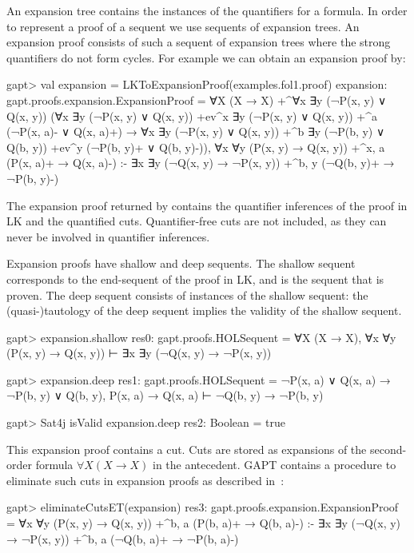 \documentclass[a4paper,11pt]{book}
\newcommand{\impl}{\to} %
\newcommand{\cli}[1]{{\ttfamily {#1}}}
\begin{document}
An expansion tree contains the instances of the quantifiers for a formula.  In order
to represent a proof of a sequent we use sequents of expansion trees.  An
expansion proof consists of such a sequent of expansion trees where the
strong quantifiers do not form cycles.
For example we can obtain an expansion proof by:
\begin{clilisting}
gapt> val expansion = LKToExpansionProof(examples.fol1.proof)
expansion: gapt.proofs.expansion.ExpansionProof =
∀X (X → X)
  +^{∀x ∃y (¬P(x, y) ∨ Q(x, y))}
    (∀x ∃y (¬P(x, y) ∨ Q(x, y)) +ev^{x}
        ∃y (¬P(x, y) ∨ Q(x, y))
        +^{a} (¬P(x, a)- ∨ Q(x, a)+) →
      ∀x ∃y (¬P(x, y) ∨ Q(x, y))
        +^{b} ∃y (¬P(b, y) ∨ Q(b, y)) +ev^{y} (¬P(b, y)+ ∨ Q(b, y)-)),
∀x ∀y (P(x, y) → Q(x, y)) +^{x, a} (P(x, a)+ → Q(x, a)-)
:-
∃x ∃y (¬Q(x, y) → ¬P(x, y)) +^{b, y} (¬Q(b, y)+ → ¬P(b, y)-)

\end{clilisting}

The expansion proof returned by \cli{LKToExpansionProof} contains the
quantifier inferences of the proof in LK and the quantified cuts.
Quantifier-free cuts are not included, as they can never be involved in
quantifier inferences.

Expansion proofs have shallow and deep sequents.  The shallow sequent
corresponds to the end-sequent of the proof in LK, and is the sequent that is
proven.  The deep sequent consists of instances of the shallow sequent: the
(quasi-)tautology of the deep sequent implies the validity of the shallow
sequent.
\begin{clilisting}
gapt> expansion.shallow
res0: gapt.proofs.HOLSequent = ∀X (X → X), ∀x ∀y (P(x, y) → Q(x, y)) ⊢ ∃x ∃y (¬Q(x, y) → ¬P(x, y))

gapt> expansion.deep
res1: gapt.proofs.HOLSequent = ¬P(x, a) ∨ Q(x, a) → ¬P(b, y) ∨ Q(b, y), P(x, a) → Q(x, a) ⊢ ¬Q(b, y) → ¬P(b, y)

gapt> Sat4j isValid expansion.deep
res2: Boolean = true

\end{clilisting}

This expansion proof contains a cut.  Cuts are stored as expansions of the
second-order formula $\forall X (X \impl X)$ in the antecedent.  GAPT contains
a procedure to eliminate such cuts in expansion proofs as described
in~\cite{Hetzl2013Expansion}:
\begin{clilisting}
gapt> eliminateCutsET(expansion)
res3: gapt.proofs.expansion.ExpansionProof =
∀x ∀y (P(x, y) → Q(x, y)) +^{b, a} (P(b, a)+ → Q(b, a)-)
:-
∃x ∃y (¬Q(x, y) → ¬P(x, y)) +^{b, a} (¬Q(b, a)+ → ¬P(b, a)-)

\end{clilisting}
\end{document}
